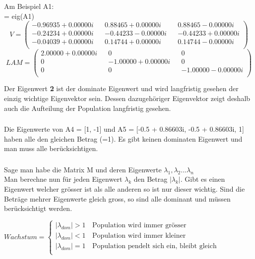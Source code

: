 \documentclass{article}
\begin{document}
\subsubsection{}
Am Beispiel A1: \\
[V, LAM] = eig(A1)
\[
V =
  \begin{pmatrix}
    -0.96935 + 0.00000i && 0.88465 + 0.00000i && 0.88465 - 0.00000i \\ 
    -0.24234 + 0.00000i && -0.44233 - 0.00000i && -0.44233 + 0.00000i \\
    -0.04039 + 0.00000i &&  0.14744 + 0.00000i && 0.14744 - 0.00000i \\
  \end{pmatrix}
\]
\[
LAM =
  \begin{pmatrix}
    2.00000 + 0.00000i && 0 && 0 \\ 
    0 && -1.00000 + 0.00000i && 0 \\
    0 &&  0 &&  -1.00000 - 0.00000i \\
  \end{pmatrix}
\]

Der Eigenwert \textbf{2} ist der dominate Eigenwert und wird langfristig gesehen der einzig wichtige Eigenvektor sein. Dessen dazugehöriger Eigenvektor zeigt deshalb auch die Aufteilung der Population langfristig gesehen.

\subsubsection{}
Die Eigenwerte von A4 = [1, -1] und A5 = [-0.5 + 0.86603i, -0.5 + 0.86603i, 1] haben alle den gleichen Betrag (=1). Es gibt keinen dominaten Eigenwert und man muss alle berücksichtigen.

\subsubsection{}
Sage man habe die Matrix M und deren Eigenwerte $\lambda_1, \lambda_2 ... \lambda_n$ \\
Man berechne nun für jeden Eigenwert $\lambda_k$ den Betrag $|\lambda_k|$. Gibt es einen Eigenwert welcher grösser ist als alle anderen so ist nur dieser wichtig. Sind die Beträge mehrer Eigenwerte gleich gross, so sind alle dominant und müssen berücksichtigt werden.

\vspace{5mm}

$Wachstum = \left\{
\begin{array}{ll}
|\lambda_{dom}| > 1 & \, \textrm{Population wird immer grösser} \\
|\lambda_{dom}| < 1 & \, \textrm{Population wird immer kleiner} \\
|\lambda_{dom}| = 1 & \, \textrm{Population pendelt sich ein, bleibt gleich} \\
\end{array}
\right. $
\end{document}
